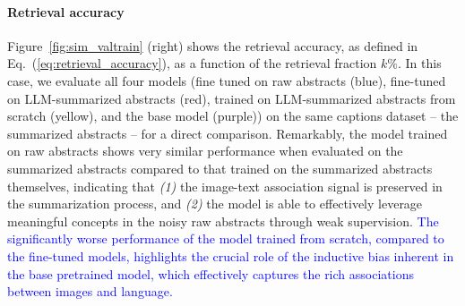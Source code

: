 \documentclass[10pt]{article} %
\newcommand{\eqrefb}[1]{(\ref{#1})}
\newcommand{\changes}[1]{\textcolor{blue}{#1}}
\begin{document}

\paragraph*{Retrieval accuracy}

Figure~\ref{fig:sim_valtrain} (right) shows the retrieval accuracy, as defined in Eq.~\eqrefb{eq:retrieval_accuracy}, as a function of the retrieval fraction $k\%$.
%
In this case, we evaluate all four models (fine tuned on raw abstracts (blue), fine-tuned on LLM-summarized abstracts (red), trained on LLM-summarized abstracts from scratch (yellow), and the base model (purple)) on the same captions dataset -- the summarized abstracts -- for a direct comparison.
%
Remarkably, the model trained on raw abstracts shows very similar performance when evaluated on the summarized abstracts compared to that trained on the summarized abstracts themselves, indicating that \emph{(1)} the image-text association signal is preserved in the summarization process, and \emph{(2)} the model is able to effectively leverage meaningful concepts in the noisy raw abstracts through weak supervision. \changes{The significantly worse performance of the model trained from scratch, compared to the fine-tuned models, highlights the crucial role of the inductive bias inherent in the base pretrained model, which effectively captures the rich associations between images and language.}
\end{document}
